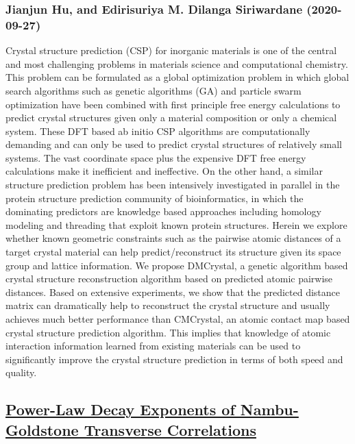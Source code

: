 \subsubsection*{Jianjun Hu, and Edirisuriya M. Dilanga Siriwardane (2020-09-27)}
Crystal structure prediction (CSP) for inorganic materials is one of the
central and most challenging problems in materials science and computational
chemistry. This problem can be formulated as a global optimization problem in
which global search algorithms such as genetic algorithms (GA) and particle
swarm optimization have been combined with first principle free energy
calculations to predict crystal structures given only a material composition or
only a chemical system. These DFT based ab initio CSP algorithms are
computationally demanding and can only be used to predict crystal structures of
relatively small systems. The vast coordinate space plus the expensive DFT free
energy calculations make it inefficient and ineffective. On the other hand, a
similar structure prediction problem has been intensively investigated in
parallel in the protein structure prediction community of bioinformatics, in
which the dominating predictors are knowledge based approaches including
homology modeling and threading that exploit known protein structures. Herein
we explore whether known geometric constraints such as the pairwise atomic
distances of a target crystal material can help predict/reconstruct its
structure given its space group and lattice information. We propose DMCrystal,
a genetic algorithm based crystal structure reconstruction algorithm based on
predicted atomic pairwise distances. Based on extensive experiments, we show
that the predicted distance matrix can dramatically help to reconstruct the
crystal structure and usually achieves much better performance than CMCrystal,
an atomic contact map based crystal structure prediction algorithm. This
implies that knowledge of atomic interaction information learned from existing
materials can be used to significantly improve the crystal structure prediction
in terms of both speed and quality.

\subsection*{\href{http://arxiv.org/abs/2009.12750v1}{Power-Law Decay Exponents of Nambu-Goldstone Transverse Correlations}}
